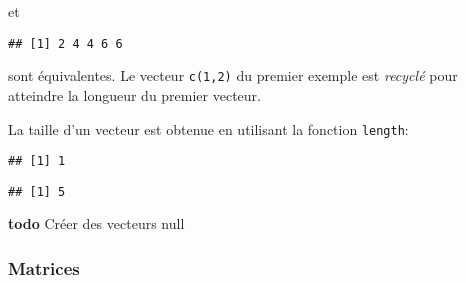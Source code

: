 \noindent et

\begin{knitrout}
\color{fgcolor}\begin{kframe}
\begin{flushleft}
\ttfamily\noindent
{}\hlkeyword{(}\hlkeyword{,}{\ }\hlkeyword{,}{\ }\hlkeyword{,}{\ }\hlkeyword{,}{\ }\hlkeyword{)}{\ }\hlkeyword{+}{\ }\hlkeyword{(}\hlkeyword{,}{\ }\hlkeyword{,}{\ }\hlkeyword{,}{\ }\hlkeyword{,}{\ }\hlkeyword{)}\mbox{}
\normalfont
\end{flushleft}
\begin{verbatim}
## [1] 2 4 4 6 6
\end{verbatim}
\end{kframe}
\end{knitrout}


\noindent sont équivalentes.
Le vecteur \texttt{c(1,2)} du premier exemple est \emph{recyclé} pour atteindre la longueur du premier vecteur.

La taille d'un vecteur est obtenue en utilisant la fonction \texttt{length}:

\begin{knitrout}
\color{fgcolor}\begin{kframe}
\begin{flushleft}
\ttfamily\noindent
{}\hlkeyword{(}\hlkeyword{)}\mbox{}
\normalfont
\end{flushleft}
\begin{verbatim}
## [1] 1
\end{verbatim}
\begin{flushleft}
\ttfamily\noindent
{}\hlkeyword{(}\hlkeyword{(}\hlkeyword{:}\hlkeyword{)}\hlkeyword{)}\mbox{}
\normalfont
\end{flushleft}
\begin{verbatim}
## [1] 5
\end{verbatim}
\end{kframe}
\end{knitrout}


\textbf{todo} Créer des vecteurs null

\subsubsection{Matrices}


